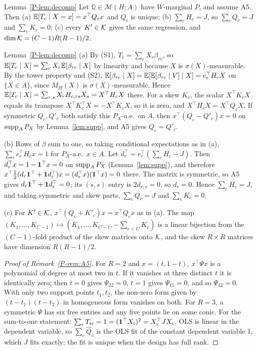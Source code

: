 \begin{restate}{Lemma~\ref{P-lem:decomp}}
Let $\mathbb Q\in\mathcal M(H;A)$ have $W$-marginal $P$, and assume A5. Then (a)
$\mathbb E[T_c\mid X=x]=x^\top Q_cx$ and $Q_c$ is unique; (b) $\sum_cH_c=J$, so
$\sum_cQ_c=J$ and $\sum_cK_c=0$; (c) every $K'\in\mathcal K$ gives the same regression,
and $\dim\mathcal K=(C-1)R(R-1)/2$.
\end{restate}
\begin{proofof}{Lemma~\ref{P-lem:decomp}}
(a) By (S1), $T_c=\sum_rX_r\beta_{rc}$, so $\mathbb E[T_c\mid X]=\sum_rX_r\mathbb E[\beta_{rc}\mid X]$
by linearity and because $X$ is $\sigma(X)$-measurable. By the tower property and
(S2), $\mathbb E[\beta_{rc}\mid X]=\mathbb E[\mathbb E[\beta_{rc}\mid V]\mid X]=e_r^\top H_cX$ on
$\{X\in A\}$, since $M_H(X)$ is $\sigma(X)$-measurable. Hence
$\mathbb E[T_c\mid X]=\sum_{r,s}X_rH_{c,rs}X_s=X^\top H_cX$ there. For a skew $K_c$, the
scalar $X^\top K_cX$ equals its transpose $X^\top K_c^\top X=-X^\top K_cX$, so it is
zero, and $X^\top H_cX=X^\top Q_cX$. If symmetric $Q_c,Q'_c$ both satisfy this
$P_X$-a.e.\ on $A$, then $x^\top(Q_c-Q'_c)x=0$ on $\operatorname{supp}_AP_X$ by
Lemma~\ref{lem:supp}, and A5 gives $Q_c=Q'_c$.

(b) Rows of $\beta$ sum to one, so taking conditional expectations as in (a),
$\sum_ce_r^\top H_cx=1$ for $P_X$-a.e.\ $x\in A$. Let
$d_r^\top=e_r^\top(\sum_cH_c-J)$. Then $d_r^\top x=1-\mathbf 1^\top x=0$ on
$\operatorname{supp}_AP_X$ (Lemma~\ref{lem:supp}), and therefore
$x^\top\tfrac12(d_r\mathbf 1^\top+\mathbf 1 d_r^\top)x=(d_r^\top x)(\mathbf 1^\top x)=0$ there. The
matrix is symmetric, so A5 gives $d_r\mathbf 1^\top+\mathbf 1 d_r^\top=0$; its $(s,s)$ entry is
$2d_{r,s}=0$, so $d_r=0$. Hence $\sum_cH_c=J$, and taking symmetric and skew parts,
$\sum_cQ_c=J$ and $\sum_cK_c=0$.

(c) For $K'\in\mathcal K$, $x^\top(Q_c+K'_c)x=x^\top Q_cx$ as in (a). The map
$(K_1,\dots,K_{C-1})\mapsto(K_1,\dots,K_{C-1},-\sum_{c<C}K_c)$ is a linear bijection
from the $(C-1)$-fold product of the skew matrices onto $\mathcal K$, and the skew
$R\times R$ matrices have dimension $R(R-1)/2$.
\end{proofof}

\begin{proof}[Proof of Remark~\ref{P-rem:A5}]
For $R=2$ and $x=(t,1-t)$, $x^\top\Psi x$ is a polynomial of degree at most two in
$t$. If it vanishes at three distinct $t$ it is identically zero; then $t=0$ gives
$\Psi_{22}=0$, $t=1$ gives $\Psi_{11}=0$, and so $\Psi_{12}=0$. With only two support
points $t_1,t_2$, the non-zero form given by $(t-t_1)(t-t_2)$ in homogeneous form
vanishes on both. For $R=3$, a symmetric $\Psi$ has six free entries and any five
points lie on some conic. For the sum-to-one statement: $\sum_cT_{ic}=1=(\mathbf 1^\top
X_i)^2=X_i^\top JX_i$, OLS is linear in the dependent variable, so $\sum_c\hat Q_c$ is the OLS
fit of the constant dependent variable 1, which $J$ fits exactly; the fit is unique when the design has
full rank.
\end{proof}

